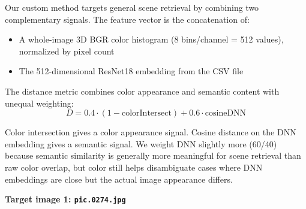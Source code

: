 \documentclass[11pt,letterpaper]{article}
\begin{document}
Our custom method targets general scene retrieval by combining two complementary
signals. The feature vector is the concatenation of:
\begin{itemize}
    \item A whole-image 3D BGR color histogram (8 bins/channel = 512 values),
          normalized by pixel count
    \item The 512-dimensional ResNet18 embedding from the CSV file
\end{itemize}

The distance metric combines color appearance and semantic content with unequal
weighting:
\[
D = 0.4 \cdot (1 - \text{colorIntersect}) + 0.6 \cdot \text{cosineDNN}
\]

Color intersection gives a color appearance signal. Cosine distance on the DNN
embedding gives a semantic signal. We weight DNN slightly more (60/40) because
semantic similarity is generally more meaningful for scene retrieval than raw
color overlap, but color still helps disambiguate cases where DNN embeddings are
close but the actual image appearance differs.

\textbf{Target image 1: \texttt{pic.0274.jpg}}
\end{document}
